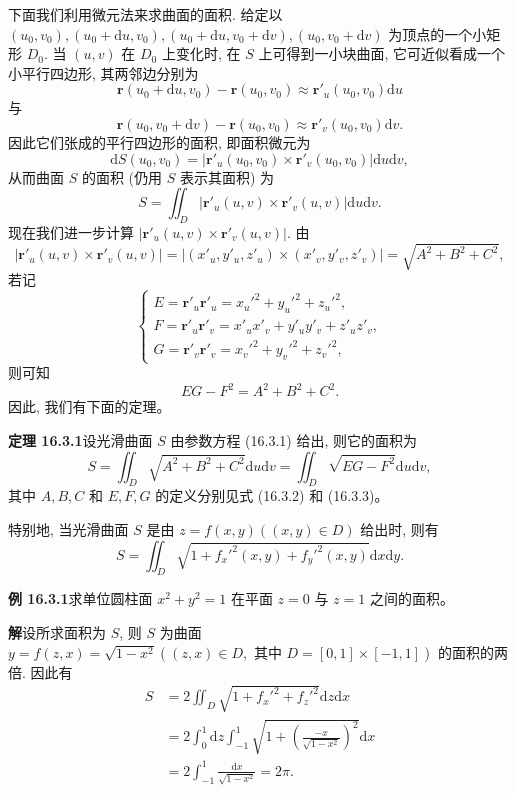 \documentclass[UTF8,12pt,a4paper,fontset=fandol]{ctexart}
\begin{document}
下面我们利用微元法来求曲面的面积. 给定以 $(u_0,v_0),(u_0+\mathrm du,v_0),(u_0+\mathrm du,v_0+\mathrm dv),(u_0,v_0+\mathrm dv)$ 为顶点的一个小矩形 $D_0$. 当 $(u,v)$ 在 $D_0$ 上变化时, 在 $S$ 上可得到一小块曲面, 它可近似看成一个小平行四边形, 其两邻边分别为
\[
  \boldsymbol r(u_0+\mathrm du,v_0)-\boldsymbol r(u_0,v_0)
  \approx \boldsymbol r'_u(u_0,v_0)\mathrm du
\]
与
\[
  \boldsymbol r(u_0,v_0+\mathrm dv)-\boldsymbol r(u_0,v_0)
  \approx \boldsymbol r'_v(u_0,v_0)\mathrm dv.
\]
因此它们张成的平行四边形的面积, 即面积微元为
\[
  \mathrm dS(u_0,v_0)=|\boldsymbol r'_u(u_0,v_0)\times\boldsymbol r'_v(u_0,v_0)|\mathrm du\mathrm dv,
\]
从而曲面 $S$ 的面积 (仍用 $S$ 表示其面积) 为
\[
  S=\iint_D |\boldsymbol r'_u(u,v)\times\boldsymbol r'_v(u,v)|\mathrm du\mathrm dv.
\]
现在我们进一步计算 $|\boldsymbol r'_u(u,v)\times\boldsymbol r'_v(u,v)|$. 由
\[
  |\boldsymbol r'_u(u,v)\times\boldsymbol r'_v(u,v)|
  =|(x'_u,y'_u,z'_u)\times(x'_v,y'_v,z'_v)|
  =\sqrt{A^2+B^2+C^2},
\]
若记
\begin{equation}
  \begin{cases}
    E=\boldsymbol r'_u\boldsymbol r'_u=x_u'^2+y_u'^2+z_u'^2,\\
    F=\boldsymbol r'_u\boldsymbol r'_v=x'_ux'_v+y'_uy'_v+z'_uz'_v,\\
    G=\boldsymbol r'_v\boldsymbol r'_v=x_v'^2+y_v'^2+z_v'^2,
  \end{cases}
  \tag{16.3.3}
\end{equation}
则可知
\[
  EG-F^2=A^2+B^2+C^2.
\]
因此, 我们有下面的定理。

\noindent\textbf{定理 16.3.1}\quad 设光滑曲面 $S$ 由参数方程 (16.3.1) 给出, 则它的面积为
\[
  S=\iint_D \sqrt{A^2+B^2+C^2}\mathrm du\mathrm dv
  =\iint_D \sqrt{EG-F^2}\mathrm du\mathrm dv,
\]
其中 $A,B,C$ 和 $E,F,G$ 的定义分别见式 (16.3.2) 和 (16.3.3)。

特别地, 当光滑曲面 $S$ 是由 $z=f(x,y)((x,y)\in D)$ 给出时, 则有
\[
  S=\iint_D \sqrt{1+f_x'^2(x,y)+f_y'^2(x,y)}\mathrm dx\mathrm dy.
\]

\noindent\textbf{例 16.3.1}\quad 求单位圆柱面 $x^2+y^2=1$ 在平面 $z=0$ 与 $z=1$ 之间的面积。

\noindent\textbf{解}\quad 设所求面积为 $S$, 则 $S$ 为曲面 $y=f(z,x)=\sqrt{1-x^2}((z,x)\in D,\text{ 其中 }D=[0,1]\times[-1,1])$ 的面积的两倍. 因此有
\[
\begin{aligned}
  S&=2\iint_D\sqrt{1+f_x'^2+f_z'^2}\mathrm dz\mathrm dx\\
  &=2\int_0^1\mathrm dz\int_{-1}^1\sqrt{1+\left(\frac{-x}{\sqrt{1-x^2}}\right)^2}\mathrm dx\\
  &=2\int_{-1}^1\frac{\mathrm dx}{\sqrt{1-x^2}}=2\pi.
\end{aligned}
\]
\end{document}
